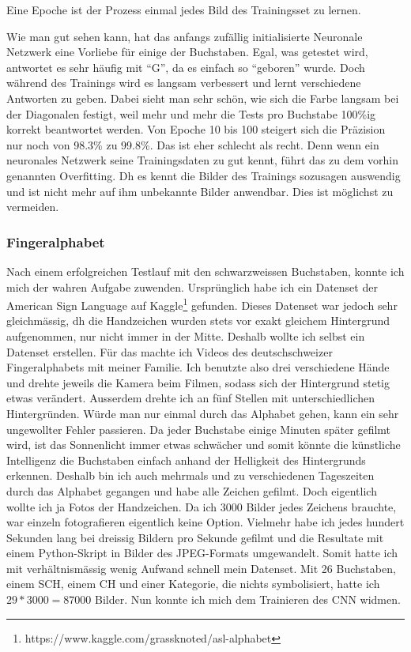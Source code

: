 \documentclass[10pt,a4paper,ngerman,english]{article}
\begin{document}
Eine Epoche ist der Prozess einmal jedes Bild des Trainingsset zu lernen.

Wie man gut sehen kann, hat das anfangs zufällig initialisierte Neuronale Netzwerk eine Vorliebe für einige der Buchstaben. Egal, was getestet wird, antwortet es sehr häufig mit \enquote{G}, da es einfach so \enquote{geboren} wurde. Doch während des Trainings wird es langsam verbessert und lernt verschiedene Antworten zu geben. Dabei sieht man sehr schön, wie sich die Farbe langsam bei der Diagonalen festigt, weil mehr und mehr die Tests pro Buchstabe 100\%ig korrekt beantwortet werden. Von Epoche 10 bis 100 steigert sich die Präzision nur noch von 98.3\% zu 99.8\%. Das ist eher schlecht als recht. Denn wenn ein neuronales Netzwerk seine Trainingsdaten zu gut kennt, führt das zu dem vorhin genannten Overfitting. Dh es kennt die Bilder des Trainings sozusagen auswendig und ist nicht mehr auf ihm unbekannte Bilder anwendbar. Dies ist möglichst zu vermeiden.

\subsubsection{Fingeralphabet}

Nach einem erfolgreichen Testlauf mit den schwarzweissen Buchstaben, konnte ich mich der wahren Aufgabe zuwenden. Ursprünglich habe ich ein Datenset der American Sign Language auf Kaggle\footnote{https://www.kaggle.com/grassknoted/asl-alphabet} gefunden. Dieses Datenset war jedoch sehr gleichmässig, dh die Handzeichen wurden stets vor exakt gleichem Hintergrund aufgenommen, nur nicht immer in der Mitte. Deshalb wollte ich selbst ein Datenset erstellen. Für das machte ich Videos des deutschschweizer Fingeralphabets mit meiner Familie. Ich benutzte also drei verschiedene Hände und drehte jeweils die Kamera beim Filmen, sodass sich der Hintergrund stetig etwas verändert. Ausserdem drehte ich an fünf Stellen mit unterschiedlichen Hintergründen. Würde man nur einmal durch das Alphabet gehen, kann ein sehr ungewollter Fehler passieren. Da jeder Buchstabe einige Minuten später gefilmt wird, ist das Sonnenlicht immer etwas schwächer und somit könnte die künstliche Intelligenz die Buchstaben einfach anhand der Helligkeit des Hintergrunds erkennen. Deshalb bin ich auch mehrmals und zu verschiedenen Tageszeiten durch das Alphabet gegangen und habe alle Zeichen gefilmt. Doch eigentlich wollte ich ja Fotos der Handzeichen. Da ich 3000 Bilder jedes Zeichens brauchte, war einzeln fotografieren eigentlich keine Option. Vielmehr habe ich jedes hundert Sekunden lang bei dreissig Bildern pro Sekunde gefilmt und die Resultate mit einem Python-Skript in Bilder des JPEG-Formats umgewandelt. Somit hatte ich mit verhältnismässig wenig Aufwand schnell mein Datenset. Mit 26 Buchstaben, einem SCH, einem CH und einer Kategorie, die nichts symbolisiert, hatte ich $ 29*3000 = 87000 $ Bilder. Nun konnte ich mich dem Trainieren des CNN widmen.
\end{document}
